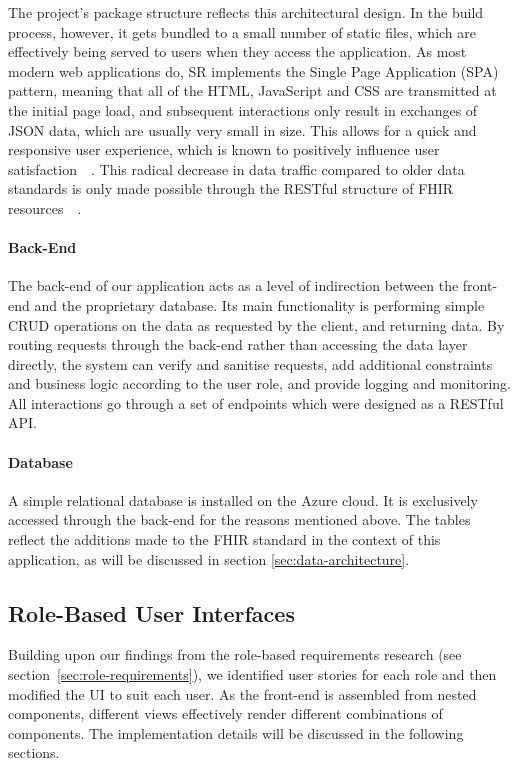 \documentclass[sigconf]{acmart}
\begin{document}
The project's package structure reflects this architectural design. In the build process, however, it gets bundled to a small number of static files, which are effectively being served to users when they access the application. As most modern web applications do, SR implements the Single Page Application (SPA) pattern, meaning that all of the HTML, JavaScript and CSS are transmitted at the initial page load, and subsequent interactions only result in exchanges of JSON data, which are usually very small in size. This allows for a quick and responsive user experience, which is known to positively influence user satisfaction~\cite{web-user-satisfaction}~\cite{web-site-usability}. This radical decrease in data traffic compared to older data standards is only made possible through the RESTful structure of FHIR resources~\cite{fhir-official}~\cite{franz2015applying}.


\paragraph{Back-End}

The back-end of our application acts as a level of indirection between the front-end and the proprietary database. Its main functionality is performing simple CRUD operations on the data as requested by the client, and returning data. By routing requests through the back-end rather than accessing the data layer directly, the system can verify and sanitise requests, add additional constraints and business logic according to the user role, and provide logging and monitoring. All interactions go through a set of endpoints which were designed as a RESTful API.

\paragraph{Database}

A simple relational database is installed on the Azure cloud. It is exclusively accessed through the back-end for the reasons mentioned above. The tables reflect the additions made to the FHIR standard in the context of this application, as will be discussed in section \ref{sec:data-architecture}.


\subsection{Role-Based User Interfaces}
\label{sec:rolebasedui}

Building upon our findings from the role-based requirements research (see section~\ref{sec:role-requirements}), we identified user stories for each role and then modified the UI to suit each user.%
As the front-end is assembled from nested components, different views effectively render different combinations of components. The implementation details will be discussed in the following sections.
\end{document}
